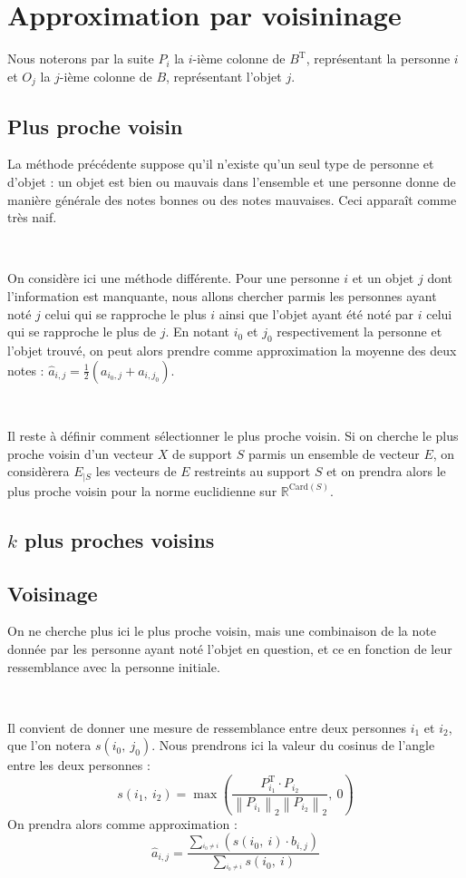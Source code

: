 \documentclass[12pt, a4paper]{article}
\newcommand{\B}{B} %
\newcommand{\Ac}[2]{a_{#1,#2}} %
\newcommand{\Bc}[2]{b_{#1,#2}} %
\newcommand{\Apc}[2]{\widehat{a}_{#1,#2}} %
\newcommand{\norme}[2]{\left\lVert #1 \right\rVert_{#2}} %
\newcommand{\tr}[1]{#1^{\mathrm{T}}} %
\newcommand{\pp}[1]{\left(#1\right)} %
\newcommand{\sdl}{

~

} %
\begin{document}
\section{Approximation par voisininage}

Nous noterons par la suite $P_i$ la $i$-ième colonne de $\tr{B}$, représentant la personne $i$ et $O_j$ la $j$-ième colonne de $\B$, représentant l'objet $j$.

\subsection{Plus proche voisin}

La méthode précédente suppose qu'il n'existe qu'un seul type de personne et d'objet : un objet est bien ou mauvais dans l'ensemble et une personne donne de manière générale des notes bonnes ou des notes mauvaises. Ceci apparaît comme très naif.
\sdl

On considère ici une méthode différente. Pour une personne $i$ et un objet $j$ dont l'information est manquante, nous allons chercher parmis les personnes ayant noté $j$ celui qui se rapproche le plus $i$ ainsi que l'objet ayant été noté par $i$ celui qui se rapproche le plus de $j$. En notant $i_0$ et $j_0$ respectivement la personne et l'objet trouvé, on peut alors prendre comme approximation la moyenne des deux notes : $\Apc{i}{j} = \frac{1}{2}\pp{\Ac{i_0}{j} + \Ac{i}{j_0}}$.

\sdl
Il reste à définir comment sélectionner le plus proche voisin. Si on cherche le plus proche voisin d'un vecteur $X$ de support $S$ parmis un ensemble de vecteur $E$, on considèrera $E_{|S}$ les vecteurs de $E$ restreints au support $S$ et on prendra alors le plus proche voisin pour la norme euclidienne sur $\mathbb{R}^{\mathrm{Card}\pp{S}}$.

\subsection{$k$ plus proches voisins}

\subsection{Voisinage}

On ne cherche plus ici le plus proche voisin, mais une combinaison de la note donnée par les personne ayant noté l'objet en question, et ce en fonction de leur ressemblance avec la personne initiale.
\sdl
Il convient de donner une mesure de ressemblance entre deux personnes $i_1$ et $i_2$, que l'on notera $s\pp{i_0,\:j_0}$.
Nous prendrons ici la valeur du cosinus de l'angle entre les deux personnes : \[
	s\pp{i_1,\:i_2} = \max\pp{\frac{\tr{P_{i_1}}\!\cdot\!P_{i_2}}{\norme{P_{i_1}}{2}\norme{P_{i_2}}{2}},\:0}
\]
On prendra alors comme approximation : \[
	\Apc{i}{j} = \frac{\underset{^{i_0\neq i}}{\sum}\pp{ s\pp{i_0,\:i}\!\cdot\!\Bc{i}{j}}}%
				{\underset{^{i_0\neq i}}{\sum}s\pp{i_0,\:i}}
\]
\end{document}
